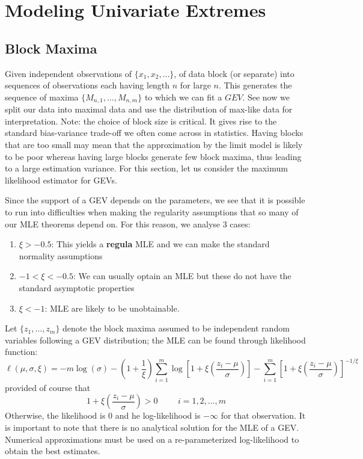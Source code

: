 \documentclass{article}
\theoremstyle{definition}
\theoremstyle{definition}
\def\l{\ell}
\begin{document}
\section{Modeling Univariate Extremes}
\subsection{Block Maxima}
Given independent observations of $\{x_1,x_2,\hdots\}$, of data block (or separate) into sequences of observations each having length $n$ for large $n$. This generates the sequence of maxima $\{M_{n,1},\hdots,M_{n,m}\}$ to which we can fit a $GEV$. See now we split our data into maximal data and use the distribution of max-like data for interpretation. Note: the choice of block size is critical. It gives rise to the standard bias-variance trade-off we often come across in statistics. Having blocks that are too small may mean that the approximation by the limit model is likely to be poor whereas having large blocks generate few block maxima, thus leading to a large estimation variance. For this section, let us consider the maximum likelihood estimator for GEVs.

Since the support of a GEV depends on the parameters, we see that it is possible to run into difficulties when making the regularity assumptions that so many of our MLE theorems depend on. For this reason, we analyse 3 cases:
\begin{enumerate}
    \item $\xi>-0.5$: This yields a \textbf{regula} MLE and we can make the standard normality assumptions
    \item $-1<\xi<-0.5$: We can usually optain an MLE but these do not have the standard asymptotic properties
    \item $\xi<-1$: MLE are likely to be unobtainable.
\end{enumerate}

Let $\{z_1,\hdots,z_m\}$ denote the block maxima assumed to be independent random variables following a GEV distribution; the MLE can be found through likelihood function:
\[\l(\mu,\sigma,\xi)=-m\log(\sigma)-(1+\frac{1}{\xi})\sum_{i=1}^m \log[1+\xi(\frac{z_i-\mu}{\sigma})]- \sum_{i=1}^m[1+\xi(\frac{z_i-\mu}{\sigma})]^{-1/\xi}\]
provided of course that \[1+\xi(\frac{z_i-\mu}{\sigma})>0\hspace{1cm}  i=1,2,\hdots,m\]
Otherwise, the likelihood is 0 and he log-likelihood is $-\infty$ for that observation. It is important to note that there is no analytical solution for the MLE of a GEV. Numerical approximations must be used 
on a re-parameterized log-likelihood to obtain the best estimates.
\end{document}
